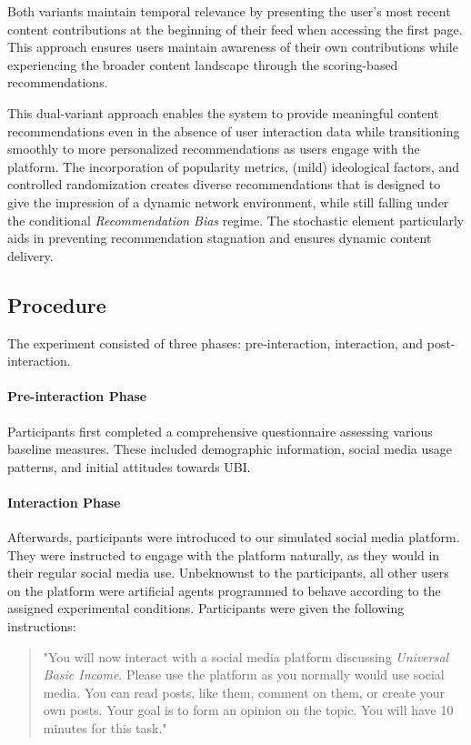 Both variants maintain temporal relevance by presenting the user's most recent content contributions at the beginning of their feed when accessing the first page. This approach ensures users maintain awareness of their own contributions while experiencing the broader content landscape through the scoring-based recommendations.

This dual-variant approach enables the system to provide meaningful content recommendations even in the absence of user interaction data while transitioning smoothly to more personalized recommendations as users engage with the platform. The incorporation of popularity metrics, (mild) ideological factors, and controlled randomization creates diverse recommendations that is designed to give the impression of a dynamic network environment, while still falling under the conditional \emph{Recommendation Bias} regime. The stochastic element particularly aids in preventing recommendation stagnation and ensures dynamic content delivery.

\subsection{Procedure}

The experiment consisted of three phases: pre-interaction, interaction, and post-interaction.

\paragraph{Pre-interaction Phase} Participants first completed a comprehensive questionnaire assessing various baseline measures. These included demographic information, social media usage patterns, and initial attitudes towards UBI. 

\paragraph{Interaction Phase} Afterwards, participants were introduced to our simulated social media platform. They were instructed to engage with the platform naturally, as they would in their regular social media use. Unbeknownst to the participants, all other users on the platform were artificial agents programmed to behave according to the assigned experimental conditions. Participants were given the following instructions:

\begin{quote}
"You will now interact with a social media platform discussing \emph{Universal Basic Income}. Please use the platform as you normally would use social media. You can read posts, like them, comment on them, or create your own posts. Your goal is to form an opinion on the topic. You will have 10 minutes for this task."
\end{quote}


